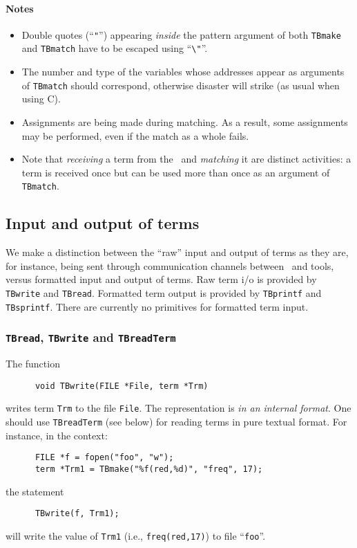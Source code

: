 \paragraph{Notes}
\begin{itemize}
\item Double quotes (``{\tt "}'') appearing {\em inside} the pattern argument
of both {\tt TBmake} and {\tt TBmatch} have to be escaped using ``\verb-\"-''.
\item The number and type of the variables whose addresses appear
as arguments of {\tt TBmatch} should correspond, otherwise disaster
will strike (as usual when using C).
\item Assignments are being made during matching. As a result, some assignments
may be performed, even if the match as a whole fails.
\item Note that {\em receiving} a term from the \TB\ and {\em matching} it are distinct
activities: a term is received once but can be used more than once
as an argument of {\tt TBmatch}.
\end{itemize}

\subsection{\label{TermIO}Input and output of terms}
We make a distinction between the ``raw'' input and output of terms
as they are, for instance, being sent through communication
channels between \TB\ and tools, versus formatted input and output
of terms. Raw term i/o is provided by {\tt TBwrite} and {\tt TBread}.
Formatted term output is provided by {\tt TBprintf} and {\tt TBsprintf}.
There are currently no primitives for formatted term input.

\subsubsection{\label{TBread/write}{\tt TBread}, {\tt TBwrite} and {\tt TBreadTerm}}
The function
\begin{verbatim}
      void TBwrite(FILE *File, term *Trm)
\end{verbatim}
writes term {\tt Trm} to the file {\tt File}. The representation is
{\em in an internal format}. One should use {\tt TBreadTerm} (see below)
for reading terms in pure textual format.
For instance, in the context:
\begin{verbatim}
      FILE *f = fopen("foo", "w");
      term *Trm1 = TBmake("%f(red,%d)", "freq", 17);
\end{verbatim}
the statement
\begin{verbatim}
      TBwrite(f, Trm1);
\end{verbatim}
will write the value of {\tt Trm1} (i.e., {\tt freq(red,17)})
to file ``{\tt foo}''.

